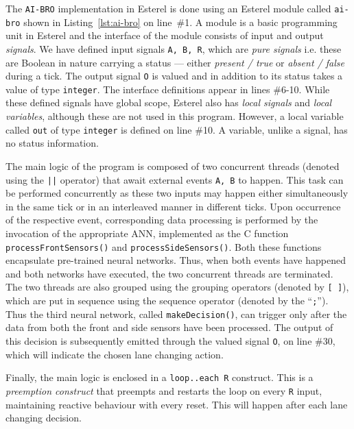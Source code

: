 The \texttt{AI-BRO} implementation in Esterel is done using an Esterel module called \texttt{ai-bro} shown in Listing~\ref{lst:ai-bro} on line~\#1.
A module is a basic programming unit in Esterel and the interface of the module consists of input and
output \emph{signals}. We have defined input signals \texttt{A, B, R}, which are \emph{pure signals}
i.e. these are Boolean in nature carrying a status --- either \emph{present / true} or \emph{absent / false} during a tick. The output signal 
\texttt{O} is valued and in addition to its status takes a value of type \texttt{integer}. The interface definitions appear in 
lines \#6-10. While these defined signals have global scope, Esterel also has \emph{local signals} and \emph{local variables}, although these are not used in this 
	program. However, a local variable called \texttt{out} of type \texttt{integer} is defined on line \#10.
A variable, unlike a signal, has no status information. 

The main logic of the program is composed of two concurrent threads (denoted using the \texttt{||} operator)
that await external events \texttt{A, B} to happen. 
This task can be performed concurrently as these two inputs may happen either simultaneously in the same tick or 
in an interleaved manner in different ticks. Upon occurrence of the respective event, corresponding data processing 
is performed by the invocation of the appropriate \ac{ANN}, implemented as the C function \texttt{processFrontSensors()}
and \texttt{processSideSensors()}. Both these functions encapsulate pre-trained neural networks. Thus, when both events have 
happened and both networks have executed, the two concurrent threads are terminated. The two threads are also grouped using the 
grouping operators (denoted by \texttt{[ ]}), which are put in sequence using the sequence operator (denoted by the ``\texttt;''). %
Thus the third neural network, called \texttt{makeDecision()},
can trigger only after the data from both the front and side sensors have been processed. 
The output of this decision is subsequently emitted through the valued signal \texttt{O}, on line \#30, which will indicate the chosen lane changing action.

Finally, the main logic is enclosed in a \texttt{loop..each R} construct. This is a \emph{preemption construct} that preempts and restarts the 
loop on every \texttt{R} input, maintaining reactive behaviour with every reset.
This will happen after each lane changing decision.

